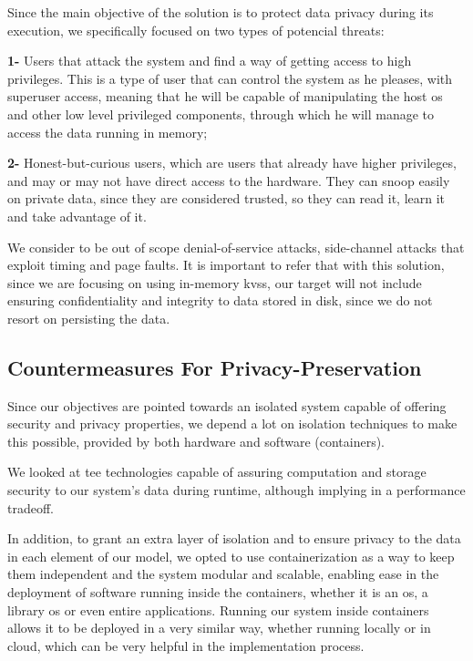 Since the main objective of the solution is to protect data privacy during its execution, we specifically focused on two types of potencial threats: 

\textbf{1-} Users that attack the system and find a way of getting access to high privileges. This is a type of user that can control the system as he pleases, with superuser access, meaning that he will be capable of manipulating the host \gls{os} and other low level privileged components, through which he will manage to access the data running in memory;

\textbf{2-}  Honest-but-curious users, which are users that already have higher privileges, and may or may not have direct access to the hardware. They can snoop easily on private data, since they are considered trusted, so they can read it, learn it and take advantage of it.

We consider to be out of scope denial-of-service attacks, side-channel attacks that exploit timing and page faults.
It is important to refer that with this solution, since we are focusing on using in-memory \gls{kvs}s, our target will not include ensuring confidentiality and integrity to data stored in disk, since we do not resort on persisting the data.

\subsection{Countermeasures For Privacy-Preservation}

Since our objectives are pointed towards an isolated system capable of offering security
and privacy properties, we depend a lot on isolation techniques to make this possible,
provided by both hardware and software (containers).

We looked at \gls{tee} technologies capable of assuring computation and storage security to our system's data during runtime, although implying in a performance tradeoff. 

In addition, to grant an extra layer of isolation and to ensure privacy to the data in each element of our model, we opted to use containerization as a way to keep them independent and the system modular and scalable, enabling ease in the deployment of software running inside the containers, whether it is an \gls{os}, a library
\gls{os} or even entire applications. Running our system inside containers allows it to be deployed in a very similar way, whether running locally or in cloud, which can be very helpful in the implementation process. 





